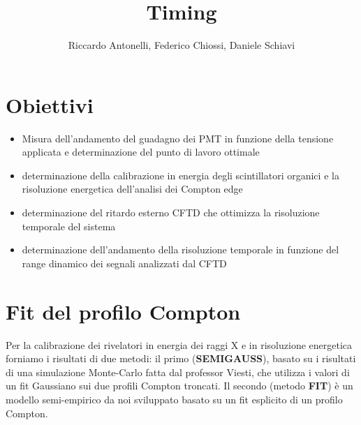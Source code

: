 \documentclass[a4paper,11pt,italian]{report}
\begin{document}
\setlength\parindent{0pt}

\author{Riccardo Antonelli, Federico Chiossi, Daniele Schiavi}
\title{Timing}

\maketitle

\section*{Obiettivi}


\begin{itemize}

\item Misura dell'andamento del guadagno dei PMT in funzione della tensione applicata e determinazione del punto di lavoro ottimale
\item determinazione della calibrazione in energia degli scintillatori organici e la risoluzione energetica dell'analisi dei Compton edge
\item determinazione del ritardo esterno CFTD che ottimizza la risoluzione temporale del sistema
\item determinazione dell'andamento della risoluzione temporale in funzione del range dinamico dei segnali analizzati dal CFTD

\end{itemize}

\section*{Fit del profilo Compton}
\label{sec:fitmethod}
Per la calibrazione dei rivelatori in energia dei raggi X e in risoluzione energetica forniamo i risultati di due metodi: il primo (\textbf{SEMIGAUSS}), basato su i risultati di una simulazione Monte-Carlo fatta dal professor Viesti, che utilizza i valori di un fit Gaussiano sui due profili Compton troncati. Il secondo (metodo \textbf{FIT}) è un modello semi-empirico da noi sviluppato basato su un fit esplicito di un profilo Compton.\\
\end{document}
